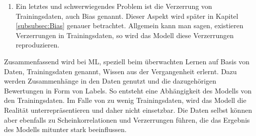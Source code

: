 \begin{onehalfspace}
\begin{enumerate}
\begin{figure}[h]
                \caption{Scheinkorrelationen in der Bilderkennung \cite{Lapuschkin2016}}
                \label{fig:Scheinkorrelation}
            \end{figure} \\
            Ein Beispiel dafür ist in Abbildung \ref*{fig:Scheinkorrelation} zu sehen. In der ein Pferdebild nicht anhand der Kontur des Pferdes, sondern anhand des Wasserzeichens in dem Bild erkannt wurde. Grund dafür war, dass einige der Trainingsdaten dieses Wasserzeichen beinhaltet haben und das Modell daraus eine Scheinkorrelation erlernt hat.\cite{Horn2022}\cite{Lapuschkin2016}\cite{Cremers2019}
            \item Ein letztes und schwerwiegendes Problem ist die Verzerrung von Trainingsdaten, auch Bias genannt. Dieser Aspekt wird später in Kapitel \ref*{subsubsec:Bias} genauer betrachtet. Allgemein kann man sagen, existieren Verzerrungen in Trainingsdaten, so wird das Modell diese Verzerrungen reproduzieren.\cite{Cremers2019}
        \end{enumerate}
        Zusammenfassend wird bei \ac*{ML}, speziell beim überwachten Lernen auf Basis von Daten, Trainingsdaten genannt, Wissen aus der Vergangenheit erlernt. Dazu werden Zusammenhänge in den Daten genutzt und die dazugehörigen Bewertungen in Form von Labels. So entsteht eine Abhängigkeit des Modells von den Trainingsdaten. Im Falle von zu wenig Trainingsdaten, wird das Modell die Realität unterrepräsentieren und daher nicht einsetzbar. Die Daten selbst können aber ebenfalls zu Scheinkorrelationen und Verzerrungen führen, die das Ergebnis des Modells mitunter stark beeinflussen.\cite{Cremers2019}
 
    \newpage

\end{onehalfspace}
